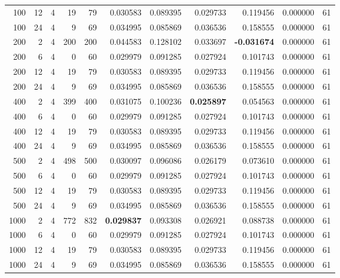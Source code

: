 \begin{table}
\begin{tabular}{rrrrrrrrrrr}
100 & 12 & 4 & 19 & 79 & 0.030583 & 0.089395 & 0.029733 & 0.119456 & 0.000000 & 61 \\
100 & 24 & 4 & 9 & 69 & 0.034995 & 0.085869 & 0.036536 & 0.158555 & 0.000000 & 61 \\
200 & 2 & 4 & 200 & 200 & 0.044583 & 0.128102 & 0.033697 & \textbf{-0.031674} & 0.000000 & 61 \\
200 & 6 & 4 & 0 & 60 & 0.029979 & 0.091285 & 0.027924 & 0.101743 & 0.000000 & 61 \\
200 & 12 & 4 & 19 & 79 & 0.030583 & 0.089395 & 0.029733 & 0.119456 & 0.000000 & 61 \\
200 & 24 & 4 & 9 & 69 & 0.034995 & 0.085869 & 0.036536 & 0.158555 & 0.000000 & 61 \\
400 & 2 & 4 & 399 & 400 & 0.031075 & 0.100236 & \textbf{0.025897} & 0.054563 & 0.000000 & 61 \\
400 & 6 & 4 & 0 & 60 & 0.029979 & 0.091285 & 0.027924 & 0.101743 & 0.000000 & 61 \\
400 & 12 & 4 & 19 & 79 & 0.030583 & 0.089395 & 0.029733 & 0.119456 & 0.000000 & 61 \\
400 & 24 & 4 & 9 & 69 & 0.034995 & 0.085869 & 0.036536 & 0.158555 & 0.000000 & 61 \\
500 & 2 & 4 & 498 & 500 & 0.030097 & 0.096086 & 0.026179 & 0.073610 & 0.000000 & 61 \\
500 & 6 & 4 & 0 & 60 & 0.029979 & 0.091285 & 0.027924 & 0.101743 & 0.000000 & 61 \\
500 & 12 & 4 & 19 & 79 & 0.030583 & 0.089395 & 0.029733 & 0.119456 & 0.000000 & 61 \\
500 & 24 & 4 & 9 & 69 & 0.034995 & 0.085869 & 0.036536 & 0.158555 & 0.000000 & 61 \\
1000 & 2 & 4 & 772 & 832 & \textbf{0.029837} & 0.093308 & 0.026921 & 0.088738 & 0.000000 & 61 \\
1000 & 6 & 4 & 0 & 60 & 0.029979 & 0.091285 & 0.027924 & 0.101743 & 0.000000 & 61 \\
1000 & 12 & 4 & 19 & 79 & 0.030583 & 0.089395 & 0.029733 & 0.119456 & 0.000000 & 61 \\
1000 & 24 & 4 & 9 & 69 & 0.034995 & 0.085869 & 0.036536 & 0.158555 & 0.000000 & 61 \\
\bottomrule
\end{tabular}
\end{table}

